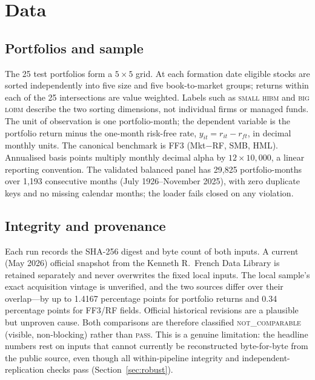 \documentclass[11pt]{article}
\begin{document}
\section{Data}\label{sec:data}
\subsection{Portfolios and sample}
The 25 test portfolios form a $5\times5$ grid. At each formation date eligible
stocks are sorted independently into five size and five book-to-market groups;
returns within each of the 25 intersections are value weighted. Labels such as
\textsc{small hibm} and \textsc{big lobm} describe the two sorting dimensions,
not individual firms or managed funds. The unit of observation is one
portfolio-month; the dependent variable is the portfolio return minus the
one-month risk-free rate, $y_{it}=r_{it}-r_{ft}$, in decimal monthly units. The
canonical benchmark is FF3 (Mkt$-$RF, SMB, HML). Annualised basis points
multiply monthly decimal alpha by $12\times10{,}000$, a linear reporting
convention. The validated balanced panel has 29,825 portfolio-months over
1,193 consecutive months (July 1926--November 2025), with zero duplicate keys
and no missing calendar months; the loader fails closed on any violation.

\subsection{Integrity and provenance}
Each run records the SHA-256 digest and byte count of both inputs. A current
(May 2026) official snapshot from the Kenneth R.\ French Data Library is
retained separately and never overwrites the fixed local inputs. The local
sample's exact acquisition vintage is unverified, and the two sources differ
over their overlap---by up to 1.4167 percentage points for portfolio returns
and 0.34 percentage points for FF3/RF fields. Official historical revisions are
a plausible but unproven cause. Both comparisons are therefore classified
\textsc{not\_comparable} (visible, non-blocking) rather than \textsc{pass}.
This is a genuine limitation: the headline numbers rest on inputs that cannot
currently be reconstructed byte-for-byte from the public source, even though all
within-pipeline integrity and independent-replication checks pass
(Section~\ref{sec:robust}).

\end{document}
